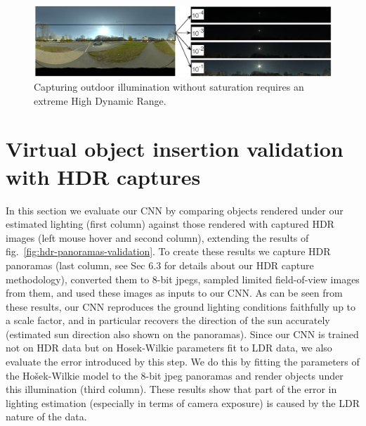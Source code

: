 \begin{figure}
\centering
\includegraphics[width=\mywidth]{db-sunny.jpg}
\caption[Outdoor dynamic range]{Capturing outdoor illumination without saturation requires an extreme High Dynamic Range.}
\end{figure}

\protect\hypertarget{virtualobjectinsertHDR}{}{}

\hypertarget{virtual-object-insertion-validation-with-hdr-captures}{%
\section{Virtual object insertion validation with HDR
captures}\label{virtual-object-insertion-validation-with-hdr-captures}}

In this section we evaluate our CNN by comparing objects rendered under
our estimated lighting (first column) against those rendered with
captured HDR images (left mouse hover and second column), extending the
results of fig.~\ref{fig:hdr-panoramas-validation}. To create these results we capture HDR panoramas
(last column, see Sec 6.3 for details about our HDR capture
methodology), converted them to 8-bit jpegs, sampled limited
field-of-view images from them, and used these images as inputs to our
CNN. As can be seen from these results, our CNN reproduces the ground
lighting conditions faithfully up to a scale factor, and in particular
recovers the direction of the sun accurately (estimated sun direction
also shown on the panoramas). Since our CNN is trained not on HDR data
but on Hosek-Wilkie parameters fit to LDR data, we also evaluate the
error introduced by this step. We do this by fitting the parameters of
the Hošek-Wilkie model to the 8-bit jpeg panoramas and render objects
under this illumination (third column). These results show that part of
the error in lighting estimation (especially in terms of camera
exposure) is caused by the LDR nature of the data.


\def\panoheight{0.25cm}

